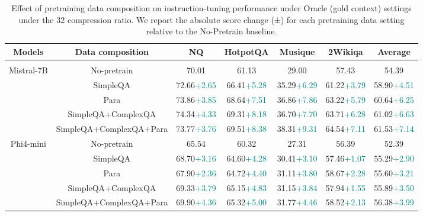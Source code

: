 \documentclass{applemlr}
\numberwithin{equation}{section}
\begin{document}
\begin{table}[H]
\centering
\scriptsize
\begin{tabular}{ccccccc}
\hline
Models & Data composition & NQ & HotpotQA& Musique& 2Wikiqa & Average \\
\hline
\rowcolor{gray!15}
\multicolumn{7}{c}{\textbf{Oracle}} \\
\multirow{5}{*}{Mistral-7B} & No-pretrain & 70.01 & 61.13 & 29.00 & 57.43 & 54.39 \\
 & SimpleQA & 72.66{\tiny\textcolor{teal}{+2.65}} & 66.41{\tiny\textcolor{teal}{+5.28}} & 35.29{\tiny\textcolor{teal}{+6.29}} & 61.22{\tiny\textcolor{teal}{+3.79}} & 58.90{\tiny\textcolor{teal}{+4.51}} \\
 & Para & 73.86{\tiny\textcolor{teal}{+3.85}} & 68.64{\tiny\textcolor{teal}{+7.51}} & 36.86{\tiny\textcolor{teal}{+7.86}} & 63.22{\tiny\textcolor{teal}{+5.79}} & 60.64{\tiny\textcolor{teal}{+6.25}} \\
 & SimpleQA+ComplexQA & 74.34{\tiny\textcolor{teal}{+4.33}} & 69.31{\tiny\textcolor{teal}{+8.18}} & 36.70{\tiny\textcolor{teal}{+7.70}} & 63.71{\tiny\textcolor{teal}{+6.28}} & 61.02{\tiny\textcolor{teal}{+6.63}} \\
 & SimpleQA+ComplexQA+Para & 73.77{\tiny\textcolor{teal}{+3.76}} & 69.51{\tiny\textcolor{teal}{+8.38}} & 38.31{\tiny\textcolor{teal}{+9.31}} & 64.54{\tiny\textcolor{teal}{+7.11}} & 61.53{\tiny\textcolor{teal}{+7.14}} \\
\hline
\multirow{5}{*}{Phi4-mini} & No-pretrain & 65.54 & 60.32 & 27.31 & 56.39 & 52.39 \\
 & SimpleQA & 68.70{\tiny\textcolor{teal}{+3.16}} & 64.60{\tiny\textcolor{teal}{+4.28}} & 30.41{\tiny\textcolor{teal}{+3.10}} & 57.46{\tiny\textcolor{teal}{+1.07}} & 55.29{\tiny\textcolor{teal}{+2.90}} \\
 & Para & 67.90{\tiny\textcolor{teal}{+2.36}} & 64.72{\tiny\textcolor{teal}{+4.40}} & 31.11{\tiny\textcolor{teal}{+3.80}} & 58.67{\tiny\textcolor{teal}{+2.28}} & 55.60{\tiny\textcolor{teal}{+3.21}} \\
 & SimpleQA+ComplexQA & 69.33{\tiny\textcolor{teal}{+3.79}} & 65.15{\tiny\textcolor{teal}{+4.83}} & 31.15{\tiny\textcolor{teal}{+3.84}} & 57.94{\tiny\textcolor{teal}{+1.55}} & 55.89{\tiny\textcolor{teal}{+3.50}} \\
 & SimpleQA+ComplexQA+Para & 69.90{\tiny\textcolor{teal}{+4.36}} & 65.32{\tiny\textcolor{teal}{+5.00}} & 31.77{\tiny\textcolor{teal}{+4.46}} & 58.52{\tiny\textcolor{teal}{+2.13}} & 56.38{\tiny\textcolor{teal}{+3.99}} \\
\toprule
\end{tabular}
\caption{Effect of pretraining data composition on instruction-tuning performance
under Oracle (gold context) settings under the 32 compression ratio. We report the absolute score change (±) for each pretraining data setting relative to the No-Pretrain baseline.}
\label{data_composition}
\end{table}
\end{document}
